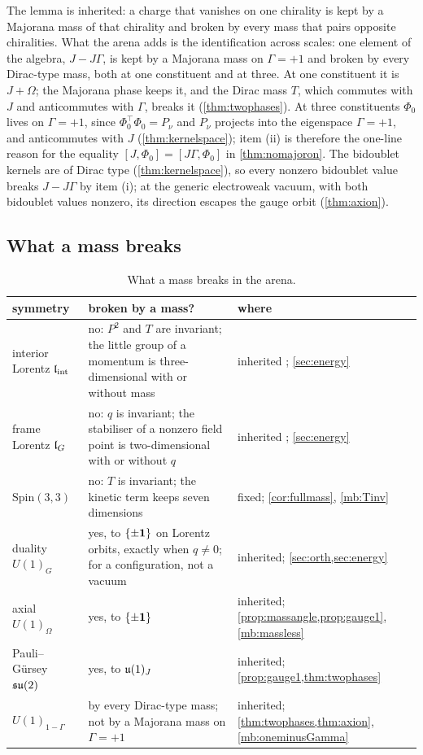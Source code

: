 The lemma is inherited: a charge that vanishes on one chirality is kept by a Majorana mass of that chirality and broken by every mass
that pairs opposite chiralities. What the arena adds is the identification across scales: one element of the algebra, $J-J\Gamma$, is
kept by a Majorana mass on $\Gamma=+1$ and broken by every Dirac-type mass, both at one constituent and at three. At one constituent it is
$J+\Omega$; the Majorana phase keeps it, and the Dirac mass $T$, which commutes with $J$ and anticommutes with $\Gamma$, breaks it
(\cref{thm:twophases}). At three constituents $\Phi_0$ lives on $\Gamma=+1$, since $\Phi_0^{\!\top}\Phi_0=P_\nu$ and $P_\nu$ projects into the eigenspace $\Gamma=+1$, and anticommutes with $J$
(\cref{thm:kernelspace}); item (ii) is therefore the one-line reason for the equality $[J,\Phi_0]=[J\Gamma,\Phi_0]$ in \cref{thm:nomajoron}. The bidoublet kernels are of Dirac type (\cref{thm:kernelspace}), so every nonzero bidoublet value breaks
$J-J\Gamma$ by item (i); at the generic electroweak vacuum, with both bidoublet values nonzero, its direction escapes the gauge orbit (\cref{thm:axion}).

\subsection{What a mass breaks}
\label{sec:massverdict}

\begin{table}[t]
\centering
\small
\begin{tabular}{@{}>{\raggedright\arraybackslash}p{3.0cm}>{\raggedright\arraybackslash}p{6.6cm}>{\raggedright\arraybackslash}p{4.6cm}@{}}
\toprule
symmetry & broken by a mass? & where\\
\midrule
interior Lorentz $\mathfrak l_{\rm int}$ & no: $P^2$ and $T$ are invariant; the little group of a momentum is three-dimensional with or without mass & inherited
\cite{WeinbergQFT}; \cref{sec:energy}\\
frame Lorentz $\mathfrak l_G$ & no: $q$ is invariant; the stabiliser of a nonzero field point is two-dimensional with or without $q$ & inherited
\cite{PenroseRindler84}; \cref{sec:energy}\\
$\mathrm{Spin}(3,3)$ & no: $T$ is invariant; the kinetic term keeps seven dimensions & fixed; \cref{cor:fullmass}, \cref{mb:Tinv}\\
duality $U(1)_G$ & yes, to $\{\pm\mathbf 1\}$ on Lorentz orbits, exactly when $q\neq0$; for a configuration, not a vacuum & inherited; \cref{sec:orth,sec:energy}\\
axial $U(1)_\Omega$ & yes, to $\{\pm\mathbf 1\}$ & inherited; \cref{prop:massangle,prop:gauge1}, \cref{mb:massless}\\
Pauli--G\"ursey $\mathfrak{su}(2)$ & yes, to $\mathfrak{u}(1)_J$ & inherited; \cref{prop:gauge1,thm:twophases}\\
$U(1)_{1-\Gamma}$ & by every Dirac-type mass; not by a Majorana mass on $\Gamma=+1$ & inherited; \cref{thm:twophases,thm:axion}, \cref{mb:oneminusGamma}\\
\bottomrule
\end{tabular}
\caption{What a mass breaks in the arena.}
\label{mb:tab:verdict}
\end{table}

